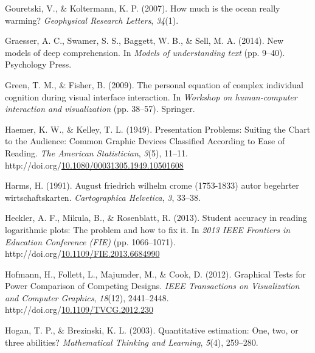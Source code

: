 \documentclass[print]{nuthesis}
\newlength{\cslhangindent}
\newenvironment{CSLReferences}[2]%
{\setlength{\parindent}{0pt}%
\everypar{\setlength{\hangindent}{\cslhangindent}}\ignorespaces}%
{\par}
\begin{document}
\begin{CSLReferences}{1}{0}
\leavevmode{}%
Gouretski, V., \& Koltermann, K. P. (2007). How much is the ocean really warming? \emph{Geophysical Research Letters}, \emph{34}(1).

\leavevmode{}%
Graesser, A. C., Swamer, S. S., Baggett, W. B., \& Sell, M. A. (2014). New models of deep comprehension. In \emph{Models of understanding text} (pp. 9--40). Psychology Press.

\leavevmode{}%
Green, T. M., \& Fisher, B. (2009). The personal equation of complex individual cognition during visual interface interaction. In \emph{Workshop on human-computer interaction and visualization} (pp. 38--57). Springer.

\leavevmode{}%
Haemer, K. W., \& Kelley, T. L. (1949). Presentation {Problems}: {Suiting} the {Chart} to the {Audience}: {Common} {Graphic} {Devices} {Classified} {According} to {Ease} of {Reading}. \emph{The American Statistician}, \emph{3}(5), 11--11. http://doi.org/\href{https://doi.org/10.1080/00031305.1949.10501608}{10.1080/00031305.1949.10501608}

\leavevmode{}%
Harms, H. (1991). August friedrich wilhelm crome (1753-1833) autor begehrter wirtschaftskarten. \emph{Cartographica Helvetica}, \emph{3}, 33--38.

\leavevmode{}%
Heckler, A. F., Mikula, B., \& Rosenblatt, R. (2013). Student accuracy in reading logarithmic plots: {The} problem and how to fix it. In \emph{2013 {IEEE} {Frontiers} in {Education} {Conference} ({FIE})} (pp. 1066--1071). http://doi.org/\href{https://doi.org/10.1109/FIE.2013.6684990}{10.1109/FIE.2013.6684990}

\leavevmode{}%
Hofmann, H., Follett, L., Majumder, M., \& Cook, D. (2012). Graphical {Tests} for {Power} {Comparison} of {Competing} {Designs}. \emph{IEEE Transactions on Visualization and Computer Graphics}, \emph{18}(12), 2441--2448. http://doi.org/\href{https://doi.org/10.1109/TVCG.2012.230}{10.1109/TVCG.2012.230}

\leavevmode{}%
Hogan, T. P., \& Brezinski, K. L. (2003). Quantitative estimation: One, two, or three abilities? \emph{Mathematical Thinking and Learning}, \emph{5}(4), 259--280.


\end{CSLReferences}
\end{document}
